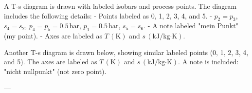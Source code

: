 A T-s diagram is drawn with labeled isobars and process points. The diagram includes the following details:  
- Points labeled as 0, 1, 2, 3, 4, and 5.  
- \( p_2 = p_3 \), \( s_4 = s_2 \), \( p_4 = p_5 = 0.5 \, \text{bar} \), \( p_1 = 0.5 \, \text{bar} \), \( s_5 = s_6 \).  
- A note labeled "mein Punkt" (my point).  
- Axes are labeled as \( T \, (\text{K}) \) and \( s \, (\text{kJ/kg·K}) \).  

Another T-s diagram is drawn below, showing similar labeled points (0, 1, 2, 3, 4, and 5). The axes are labeled as \( T \, (\text{K}) \) and \( s \, (\text{kJ/kg·K}) \). A note is included: "nicht nullpunkt" (not zero point).  

---